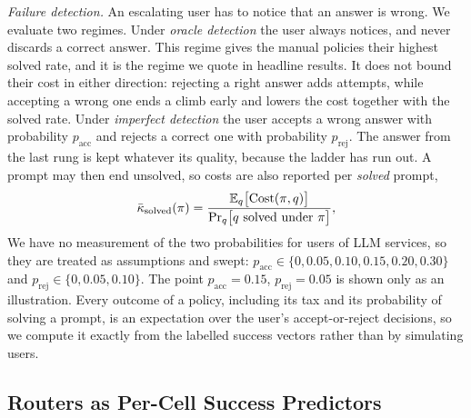\emph{Failure detection.} An escalating user has to notice that an answer
is wrong. We evaluate two regimes. Under \emph{oracle detection} the user
always notices, and never discards a correct answer. This regime gives the
manual policies their highest solved rate, and it is the regime we quote in
headline results. It does not bound their cost in either direction:
rejecting a right answer adds attempts, while accepting a wrong one ends a
climb early and lowers the cost together with the solved rate. Under
\emph{imperfect detection} the
user accepts a wrong answer with probability $p_{\mathrm{acc}}$ and
rejects a correct one with probability $p_{\mathrm{rej}}$. The answer from
the last rung is kept whatever its quality, because the ladder has run out.
A prompt may then end unsolved, so costs are also reported per
\emph{solved} prompt,
\begin{equation}
  \bar{\kappa}_{\mathrm{solved}}(\pi) =
  \frac{\mathbb{E}_q\bigl[\mathrm{Cost}(\pi, q)\bigr]}
       {\Pr_q\bigl[\text{$q$ solved under $\pi$}\bigr]},
  \label{eq:persolved}
\end{equation}
We have no measurement of the two probabilities for users of LLM
services, so they are treated as assumptions and swept:
$p_{\mathrm{acc}} \in \{0, 0.05, 0.10, 0.15, 0.20, 0.30\}$ and
$p_{\mathrm{rej}} \in \{0, 0.05, 0.10\}$. The point $p_{\mathrm{acc}} =
0.15$, $p_{\mathrm{rej}} = 0.05$ is shown only as an illustration. Every
outcome of a policy, including its tax and its probability of solving a
prompt, is an expectation over the user's accept-or-reject decisions, so we
compute it exactly from the labelled success vectors rather than by
simulating users.

\subsection{Routers as Per-Cell Success Predictors}
\label{sec:routers}

